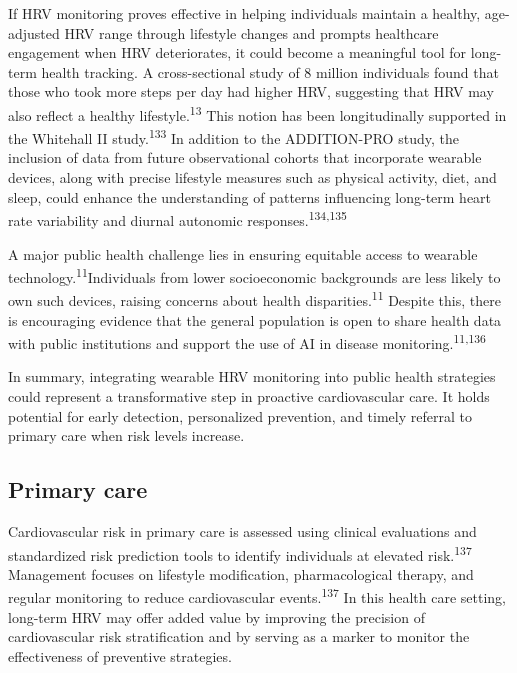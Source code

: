 \documentclass[
  a4paper,
  headsepline=true,
  open=left]{scrbook}
\begin{document}
If HRV monitoring proves effective in helping individuals maintain a
healthy, age-adjusted HRV range through lifestyle changes and prompts
healthcare engagement when HRV deteriorates, it could become a
meaningful tool for long-term health tracking. A cross-sectional study
of 8 million individuals found that those who took more steps per day
had higher HRV, suggesting that HRV may also reflect a healthy
lifestyle.\textsuperscript{13} This notion has been longitudinally
supported in the Whitehall II study.\textsuperscript{133} In addition to
the ADDITION-PRO study, the inclusion of data from future observational
cohorts that incorporate wearable devices, along with precise lifestyle
measures such as physical activity, diet, and sleep, could enhance the
understanding of patterns influencing long-term heart rate variability
and diurnal autonomic responses.\textsuperscript{134,135}

A major public health challenge lies in ensuring equitable access to
wearable technology.\textsuperscript{11}Individuals from lower
socioeconomic backgrounds are less likely to own such devices, raising
concerns about health disparities.\textsuperscript{11} Despite this,
there is encouraging evidence that the general population is open to
share health data with public institutions and support the use of AI in
disease monitoring.\textsuperscript{11,136}

In summary, integrating wearable HRV monitoring into public health
strategies could represent a transformative step in proactive
cardiovascular care. It holds potential for early detection,
personalized prevention, and timely referral to primary care when risk
levels increase.

\hypertarget{primary-care}{%
\subsection{Primary care}\label{primary-care}}

Cardiovascular risk in primary care is assessed using clinical
evaluations and standardized risk prediction tools to identify
individuals at elevated risk.\textsuperscript{137} Management focuses on
lifestyle modification, pharmacological therapy, and regular monitoring
to reduce cardiovascular events.\textsuperscript{137} In this health
care setting, long-term HRV may offer added value by improving the
precision of cardiovascular risk stratification and by serving as a
marker to monitor the effectiveness of preventive strategies.
\end{document}
